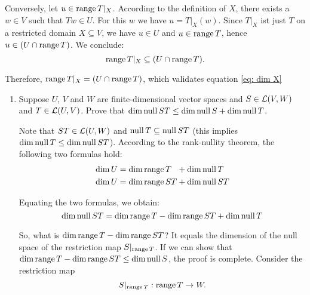 \begin{xrcs}
\begin{xprf}
    Conversely, let $u \in \operatorname{range} T|_X$. According to the definition of $X$, there exists a $w \in V$ such that $Tw \in U$. For this $w$ we have $u = T|_X (w)$. Since $T|_X$ ist just $T$ on a restricted domain $X \subseteq V$, we have $u \in U$ and $u \in \operatorname{range} T$, hence $u \in (U \cap \operatorname{range} T)$. We conclude:
    \begin{equation}
      \operatorname{range} T|_X \subseteq (U \cap \operatorname{range} T).
    \end{equation}

    Therefore, $\operatorname{range} T|_X = (U \cap \operatorname{range} T)$, which validates equation \eqref{eq: dim X}
  \end{xprf}
\end{xrcs}

\begin{xrcs}
  \begin{enumerate}
    \item {
    Suppose $U$, $V$ and $W$ are finite-dimensional vector spaces and $S \in \mathcal{L} (V,W)$ and $T \in \mathcal{L}(U,V)$. Prove that $\dim \operatorname{null} ST \leq \dim \operatorname{null} S + \dim \operatorname{null} T$.

    \begin{xprf}
      Note that $ST \in \mathcal{L}(U,W)$ and $\operatorname{null} T \subseteq \operatorname{null} ST$ (this implies $\dim \operatorname{null} T \leq \dim \operatorname{null} ST$). According to the rank-nullity theorem, the following two formulas hold:
      \begin{equation}
        \begin{aligned}
          \dim U &= \dim \operatorname{range} T\phantom{S} + \dim \operatorname{null} T\phantom{S} \\
          \dim U &= \dim \operatorname{range} ST + \dim \operatorname{null} ST
        \end{aligned}
      \end{equation}

      Equating the two formulas, we obtain:
      \begin{equation}
        \label{eq: dim null ST}
        \dim \operatorname{null} ST = \dim \operatorname{range} T - \dim \operatorname{range} ST + \dim \operatorname{null} T
      \end{equation}

      So, what is $\dim \operatorname{range} T - \dim \operatorname{range} ST$? It equals the dimension of the null space of the restriction map $S|_{\operatorname{range} T}$. If we can show that $\dim \operatorname{range} T - \dim \operatorname{range} ST \leq \dim \operatorname{null} S$, the proof is complete. Consider the restriction map
      \begin{equation}
        S|_{\operatorname{range} T}: \operatorname{range} T \to W.
      \end{equation}


\end{xprf}}
\end{enumerate}
\end{xrcs}
